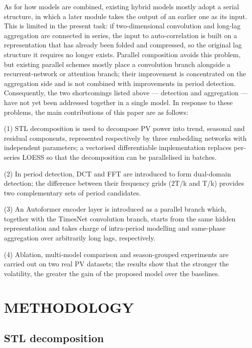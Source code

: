 \documentclass{iopjournal}
\begin{document}
As for how models are combined, existing hybrid models mostly adopt a serial structure, in which a later module takes the output of an earlier one as its input. This is limited in the present task: if two-dimensional convolution and long-lag aggregation are connected in series, the input to auto-correlation is built on a representation that has already been folded and compressed, so the original lag structure it requires no longer exists. Parallel composition avoids this problem, but existing parallel schemes mostly place a convolution branch alongside a recurrent-network or attention branch; their improvement is concentrated on the aggregation side and is not combined with improvements in period detection. Consequently, the two shortcomings listed above --- detection and aggregation --- have not yet been addressed together in a single model. In response to these problems, the main contributions of this paper are as follows:

(1) STL decomposition is used to decompose PV power into trend, seasonal and residual components, represented respectively by three embedding networks with independent parameters; a vectorised differentiable implementation replaces per-series LOESS so that the decomposition can be parallelised in batches.

(2) In period detection, DCT and FFT are introduced to form dual-domain detection; the difference between their frequency grids (2T/k and T/k) provides two complementary sets of period candidates.

(3) An Autoformer encoder layer is introduced as a parallel branch which, together with the TimesNet convolution branch, starts from the same hidden representation and takes charge of intra-period modelling and same-phase aggregation over arbitrarily long lags, respectively.

(4) Ablation, multi-model comparison and season-grouped experiments are carried out on two real PV datasets; the results show that the stronger the volatility, the greater the gain of the proposed model over the baselines.

\section{METHODOLOGY}

\subsection{STL decomposition}
\end{document}
